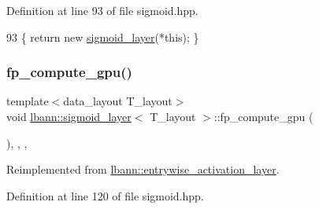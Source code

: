 Definition at line 93 of file sigmoid.\+hpp.


\begin{DoxyCode}
93 \{ \textcolor{keywordflow}{return} \textcolor{keyword}{new} \hyperlink{classlbann_1_1sigmoid__layer_a7e9b873bf8d5c89ad66b7500d3c3f05f}{sigmoid\_layer}(*\textcolor{keyword}{this}); \}
\end{DoxyCode}
\mbox{\label{classlbann_1_1sigmoid__layer_a1a2c1a56ca20677d4278a5787fa7fc86}} 
\subsubsection{\texorpdfstring{fp\+\_\+compute\+\_\+gpu()}{fp\_compute\_gpu()}}
{\footnotesize\ttfamily template$<$data\+\_\+layout T\+\_\+layout$>$ \\
void \hyperlink{classlbann_1_1sigmoid__layer}{lbann\+::sigmoid\+\_\+layer}$<$ T\+\_\+layout $>$\+::fp\+\_\+compute\+\_\+gpu (\begin{DoxyParamCaption}{ }\end{DoxyParamCaption})\hspace{0.3cm}{\ttfamily [inline]}, {\ttfamily [override]}, {\ttfamily [protected]}, {\ttfamily [virtual]}}



Reimplemented from \hyperlink{classlbann_1_1entrywise__activation__layer_aeb270dda0c2ec95dd34c35e1e8300f11}{lbann\+::entrywise\+\_\+activation\+\_\+layer}.



Definition at line 120 of file sigmoid.\+hpp.


